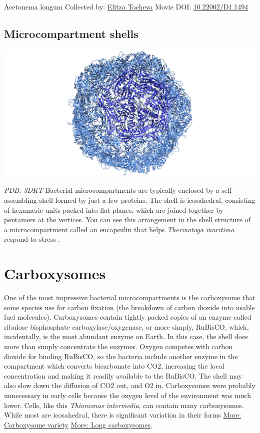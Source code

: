 \documentclass[]{tufte-book}
\begin{document}
\label{fig:4-6}Acetonema longum Collected by: \protect\hyperlink{elitza_tocheva}{Elitza Tocheva} Movie DOI: \href{https://doi.org/10.22002/D1.1494}{10.22002/D1.1494}

\hypertarget{Microcompartment_shells}{%
\subsection{Microcompartment shells}\label{Microcompartment_shells}}

\includegraphics{img/schematics/4_6_1}

\emph{PDB: 3DKT}
Bacterial microcompartments are typically enclosed by a self-assembling shell formed by just a few proteins. The shell is icosahedral, consisting of hexameric units packed into flat planes, which are joined together by pentamers at the vertices. You can see this arrangement in the shell structure of a microcompartment called an encapsulin that helps \emph{Thermotoga maritima} respond to stress \citep{sutter2008}.

\hypertarget{carboxysomes}{%
\section{Carboxysomes}\label{carboxysomes}}

One of the most impressive bacterial microcompartments is the carboxysome that some species use for carbon fixation (the breakdown of carbon dioxide into usable fuel molecules). Carboxysomes contain tightly packed copies of an enzyme called ribulose bisphosphate carboxylase/oxygenase, or more simply, RuBisCO, which, incidentally, is the most abundant enzyme on Earth. In this case, the shell does more than simply concentrate the enzymes. Oxygen competes with carbon dioxide for binding RuBisCO, so the bacteria include another enzyme in the compartment which converts bicarbonate into CO2, increasing the local concentration and making it readily available to the RuBisCO. The shell may also slow down the diffusion of CO2 out, and O2 in. Carboxysomes were probably unnecessary in early cells because the oxygen level of the environment was much lower. Cells, like this \emph{Thiomonas intermedia}, can contain many carboxysomes. While most are icosahedral, there is significant variation in their forms \protect\hyperlink{Carboxysome_variety}{More: Carboxysome variety} \protect\hyperlink{Long_carboxysomes}{More: Long carboxysomes}.
\end{document}
